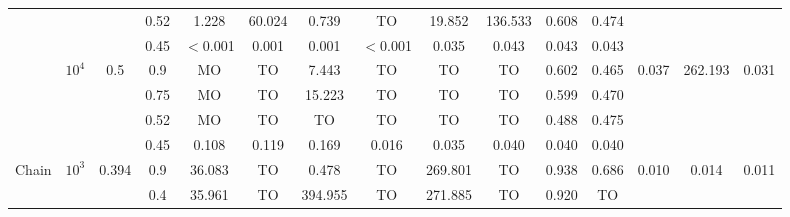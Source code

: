 \begin{sidewaystable}
\begin{lrbox}{\lstbox}
\begin{minipage}{\textheight}
\begin{tabular}{ccccccccccccccc}
				                                               &                            &                           & 0.52                     & 1.228       & 60.024       & 0.739       & TO       & 19.852  & 136.533 & 0.608   & 0.474                                                                                            \\
				                                               &                            &                           & \cellcolor{gray!25}0.45  & $<$0.001    & 0.001        & 0.001       & $<$0.001 & 0.035   & 0.043   & 0.043   & 0.043                                                                                            \\
				\cmidrule[0.5pt](r){2-15}
				                                               & \multirow{4}{*}{$10^4$}    & \multirow{4}{*}{0.5}      & 0.9                      & MO          & TO           & 7.443       & TO       & TO      & TO      & 0.602   & 0.465   & \multirow{4}{*}{0.037}             & \multirow{4}{*}{262.193} & \multirow{4}{*}{0.031} \\
				                                               &                            &                           & 0.75                     & MO          & TO           & 15.223      & TO       & TO      & TO      & 0.599   & 0.470                                                                                            \\
				                                               &                            &                           & 0.52                     & MO          & TO           & TO          & TO       & TO      & TO      & 0.488   & 0.475                                                                                            \\
				                                               &                            &                           & \cellcolor{gray!25}0.45  & 0.108       & 0.119        & 0.169       & 0.016    & 0.035   & 0.040   & 0.040   & 0.040                                                                                            \\
				\midrule
				\multirow{4}{*}{Chain}                         & \multirow{4}{*}{$10^3$}    & \multirow{4}{*}{0.394}    & 0.9                      & 36.083      & TO           & 0.478       & TO       & 269.801 & TO      & 0.938   & 0.686   & \multirow{4}{*}{0.010}             & \multirow{4}{*}{0.014}   & \multirow{4}{*}{0.011} \\
				                                               &                            &                           & 0.4                      & 35.961      & TO           & 394.955     & TO       & 271.885 & TO      & 0.920   & TO                                                                                               \\

\end{tabular}
\end{minipage}
\end{lrbox}
\end{sidewaystable}
